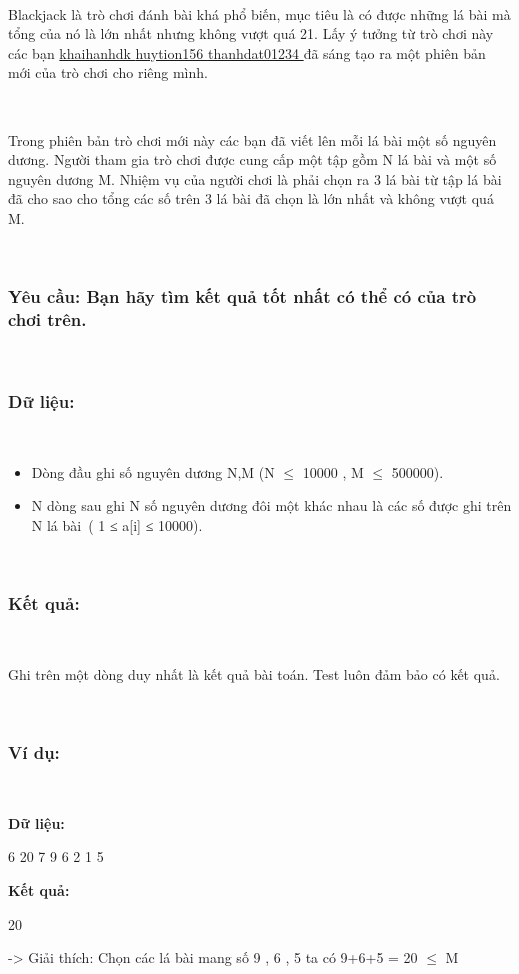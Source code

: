 

 

Blackjack là trò chơi đánh bài khá phổ biến, mục tiêu là có được những lá bài mà tổng của nó là lớn nhất nhưng không vượt quá 21. Lấy ý tưởng từ trò chơi này các bạn \href{http://vnoi.info/index.php?option=com_voj2&amp;page=user&amp;user=khaihanhdk}{ khaihanhdk }\href{http://vnoi.info/index.php?option=com_voj2&amp;page=user&amp;user=huytion156}{ huytion156 }\href{http://vnoi.info/index.php?option=com_voj2&amp;page=user&amp;user=thanhdat01234}{ thanhdat01234 } đã sáng tạo ra một phiên bản mới của trò chơi cho riêng mình.

 

Trong phiên bản trò chơi mới này các bạn đã viết lên mỗi lá bài một số nguyên dương. Người tham gia trò chơi được cung cấp một tập gồm N lá bài và một số nguyên dương M. Nhiệm vụ của người chơi là phải chọn ra 3 lá bài từ tập lá bài đã cho sao cho tổng các số trên 3 lá bài đã chọn là lớn nhất và không vượt quá M.

 

\subsubsection{Yêu cầu: Bạn hãy tìm kết quả tốt nhất có thể có của trò chơi trên.}

 

\subsubsection{Dữ liệu:}

 
\begin{itemize}
	\item Dòng đầu ghi số nguyên dương N,M (N $\le$ 10000 , M $\le$ 500000).
	\item N dòng sau ghi N số nguyên dương đôi một khác nhau là các số được ghi trên N lá bài ( 1 ≤ a[i] ≤ 10000).
\end{itemize}

 

\subsubsection{Kết quả:}

 

Ghi trên một dòng duy nhất là kết quả bài toán. Test luôn đảm bảo có kết quả.

 

\subsubsection{Ví dụ:}

 

\textbf{Dữ liệu: }

6 20 7 9 6 2 1 5

\textbf{Kết quả: }

20

-> Giải thích: Chọn các lá bài mang số 9 , 6 , 5 ta có 9+6+5 = 20  $\le$  M
